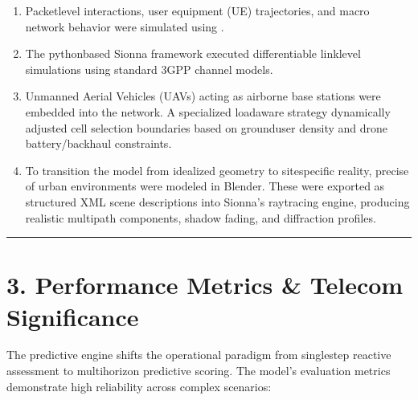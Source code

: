 \documentclass[letterpaper,10pt,english]{sphinxmanual}
\begin{document}
\begin{enumerate}
%
\item {} 
\sphinxAtStartPar
{} Packet\sphinxhyphen{}level interactions, user equipment (UE) trajectories, and macro network behavior were simulated using .

\item {} 
\sphinxAtStartPar
{} The python\sphinxhyphen{}based Sionna framework executed differentiable link\sphinxhyphen{}level simulations using standard 3GPP  channel models.

\item {} 
\sphinxAtStartPar
{} Unmanned Aerial Vehicles (UAVs) acting as airborne base stations were embedded into the network. A specialized load\sphinxhyphen{}aware strategy dynamically adjusted cell selection boundaries based on ground\sphinxhyphen{}user density and drone battery/backhaul constraints.

\item {} 
\sphinxAtStartPar
{} To transition the model from idealized geometry to site\sphinxhyphen{}specific reality, precise  of urban environments were modeled in Blender. These were exported as structured XML scene descriptions into Sionna’s ray\sphinxhyphen{}tracing engine, producing realistic multipath components, shadow fading, and diffraction profiles.

\end{enumerate}


\bigskip\hrule\bigskip



\section{3. Performance Metrics \& Telecom Significance}
\label{\detokenize{deployement:performance-metrics-telecom-significance}}
\sphinxAtStartPar
The predictive engine shifts the operational paradigm from single\sphinxhyphen{}step reactive assessment to multi\sphinxhyphen{}horizon predictive scoring. The model’s evaluation metrics demonstrate high reliability across complex scenarios:
\end{document}
